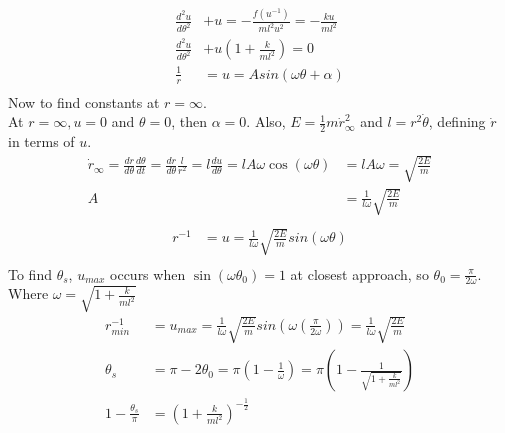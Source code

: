\documentclass[]{article}
\begin{document}
	\begin{equation}
		\begin{split}
			\frac{d^2u}{d\theta^2} &+ u = -\frac{f(u^{-1})}{ml^2u^2} = -\frac{ku}{ml^2} \\
			\frac{d^2u}{d\theta^2} &+ u\left(1 + \frac{k}{ml^2}\right) = 0 \\
			\frac{1}{r} &= u = Asin(\omega \theta + \alpha) \\
		\end{split}
	\end{equation}
	Now to find constants at $ r = \infty $. \\
	At  $ r = \infty, u = 0 $ and $ \theta = 0 $, then $ \alpha = 0 $. Also, $ E = \frac{1}{2}m\dot{r}_\infty^2 $ and $ l = r^2\dot{\theta} $, defining $\dot{r}$ in terms of $u$.
	\begin{equation}
		\begin{split}
			\dot{r}_\infty = \frac{dr}{d\theta} \frac{d\theta}{dt} = \frac{dr}{d\theta} \frac{l}{r^2} = l \frac{du}{d\theta} = lA\omega \cos(\omega\theta) &= lA\omega = \sqrt{\frac{2E}{m}} \\
			A &= \frac{1}{l\omega} \sqrt{\frac{2E}{m}} \\
		\end{split}
	\end{equation}
	\begin{equation}
		\begin{split}
			r^{-1} &= u = \frac{1}{l\omega} \sqrt{\frac{2E}{m}} sin(\omega \theta) \\
		\end{split}
	\end{equation}
	To find $ \theta_s $, $ u_{max} $ occurs when $ \sin(\omega \theta_0) = 1 $ at closest approach, so $ \theta_0 = \frac{\pi}{2\omega} $. Where $ \omega = \sqrt{1 + \frac{k}{ml^2}}$ \\
	\begin{equation}
		\begin{split}
			r_{min}^{-1} &= u_{max} = \frac{1}{l\omega} \sqrt{\frac{2E}{m}} sin(\omega (\frac{\pi}{2\omega})) = \frac{1}{l\omega} \sqrt{\frac{2E}{m}} \\
			\theta_s &= \pi - 2\theta_0 = \pi\left(1 - \frac{1}{\omega}\right) = \pi\left(1 - \frac{1}{\sqrt{1 + \frac{k}{ml^2}}}\right) \\
			1 - \frac{\theta_s}{\pi} &= \left(1 + \frac{k}{ml^2} \right)^{-\frac{1}{2}} \\
		\end{split}
	\end{equation}
\end{document}
